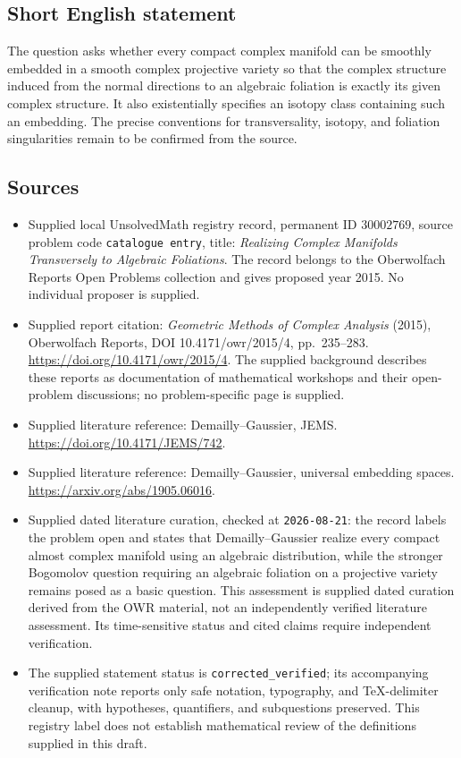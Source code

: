 \documentclass[11pt]{article}
\begin{document}
\subsection{Short English statement}
The question asks whether every compact complex manifold can be smoothly embedded in a smooth complex projective variety so that the complex structure induced from the normal directions to an algebraic foliation is exactly its given complex structure. It also existentially specifies an isotopy class containing such an embedding. The precise conventions for transversality, isotopy, and foliation singularities remain to be confirmed from the source.
\subsection{Sources}
\begin{itemize}
\item Supplied local UnsolvedMath registry record, permanent ID \(30002769\), source problem code \texttt{catalogue entry}, title: \emph{Realizing Complex Manifolds Transversely to Algebraic Foliations}. The record belongs to the Oberwolfach Reports Open Problems collection and gives proposed year 2015. No individual proposer is supplied.
\item Supplied report citation: \emph{Geometric Methods of Complex Analysis} (2015), Oberwolfach Reports, DOI 10.4171/owr/2015/4, pp.\ 235--283. \url{https://doi.org/10.4171/owr/2015/4}. The supplied background describes these reports as documentation of mathematical workshops and their open-problem discussions; no problem-specific page is supplied.
\item Supplied literature reference: Demailly--Gaussier, JEMS. \url{https://doi.org/10.4171/JEMS/742}.
\item Supplied literature reference: Demailly--Gaussier, universal embedding spaces. \url{https://arxiv.org/abs/1905.06016}.
\item Supplied dated literature curation, checked at \texttt{2026-08-21}: the record labels the problem open and states that Demailly--Gaussier realize every compact almost complex manifold using an algebraic distribution, while the stronger Bogomolov question requiring an algebraic foliation on a projective variety remains posed as a basic question. This assessment is supplied dated curation derived from the OWR material, not an independently verified literature assessment. Its time-sensitive status and cited claims require independent verification.
\item The supplied statement status is \texttt{corrected\_verified}; its accompanying verification note reports only safe notation, typography, and TeX-delimiter cleanup, with hypotheses, quantifiers, and subquestions preserved. This registry label does not establish mathematical review of the definitions supplied in this draft.
\end{itemize}
\end{document}

